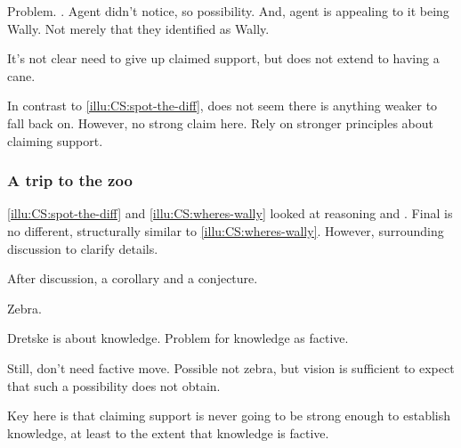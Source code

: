 \begin{note}
  Problem.
  \requ{}.
  Agent didn't notice, so possibility.
  And, agent is appealing to it being Wally.
  Not merely that they identified as Wally.

  It's not clear need to give up claimed support, but does not extend to having a cane.

  In contrast to \ref{illu:CS:spot-the-diff}, does not seem there is anything weaker to fall back on.
  However, no strong claim here.
  Rely on stronger principles about claiming support.
\end{note}

\subsubsection{A trip to the zoo}

\begin{note}
   \ref{illu:CS:spot-the-diff} and \ref{illu:CS:wheres-wally} looked at reasoning and .
  Final  is no different, structurally similar to \autoref{illu:CS:wheres-wally}.
  However, surrounding discussion to clarify details.

  After discussion, a corollary and a conjecture.
\end{note}

\begin{note}
  Zebra.

  Dretske is about knowledge.
  Problem for knowledge as factive.

  Still, don't need factive move.
  Possible not zebra, but vision is sufficient to expect that such a possibility does not obtain.

  Key here is that claiming support is never going to be strong enough to establish knowledge, at least to the extent that knowledge is factive.
\end{note}

